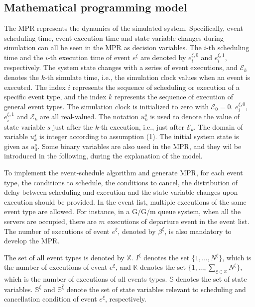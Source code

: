 \documentclass[]{interact}
\theoremstyle{plain}%
\theoremstyle{definition}
\theoremstyle{remark}
\begin{document}
\subsection{Mathematical programming model}

The MPR represents the dynamics of the simulated system. Specifically, event scheduling time, event execution time and state variable changes during simulation can all be seen in the MPR as decision variables. The $i$-th scheduling time and the $i$-th execution time of event $e^{\xi}$ are denoted by $e^{\xi,0}_{i}$ and $e^{\xi,1}_{i}$, respectively. The system state changes with a series of event executions,  and $\mathcal{E}_k$ denotes the $k$-th simulate time, i.e., the simulation clock values when an event is executed. The index $i$ represents the sequence of scheduling or execution of a specific event type, and the index $k$ represents the sequence of execution of general event types. The simulation clock is initialized to zero with $\mathcal{E}_0 = 0$. $e^{\xi,0}_{i}$, $e^{\xi,1}_{i}$ and $\mathcal{E}_k$ are all real-valued. The notation $u^s_k$ is used to denote the value of state variable $s$ just after the $k$-th execution, i.e., just after $\mathcal{E}_k$. The domain of variable $u^s_k$ is integer according to assumption (1). The initial system state is given as $u^s_0$. Some binary variables are also used in the MPR, and they wil be introduced in the following, during the explanation of the model. 


To implement the event-schedule algorithm and generate MPR, for each event type, the conditions to schedule, the conditions to cancel, the distribution of  delay between scheduling and execution and the state variable changes upon execution should be provided. In the event list, multiple executions of the same event type are allowed. For instance, in a G/G/m queue system, when all the servers are occupied, there are $m$ executions of departure event in the event list. The number of executions of event $e^{\xi}$, denoted by $\beta^{\xi}$, is also mandatory to develop the MPR.

The set of all event types is denoted by $\mathbb{X}$. $I^{\xi}$ denotes the set $\{1,...,N^{\xi}\}$, which is the number of executions of event $e^{\xi}$, and $\mathbb{K}$ denotes the set $\{1,...,\sum_{\xi\in\mathbb{X}}N^{\xi}\}$, which is the number of executions of all events types. $\mathbb{S}$ denotes the set of state variables. $\mathbb{S}^{\xi}$ and $\mathbb{S}^{\bar{\xi}}$ denote the set of state variables relevant to scheduling and cancellation condition of event $e^{\xi}$, respectively.
\end{document}
